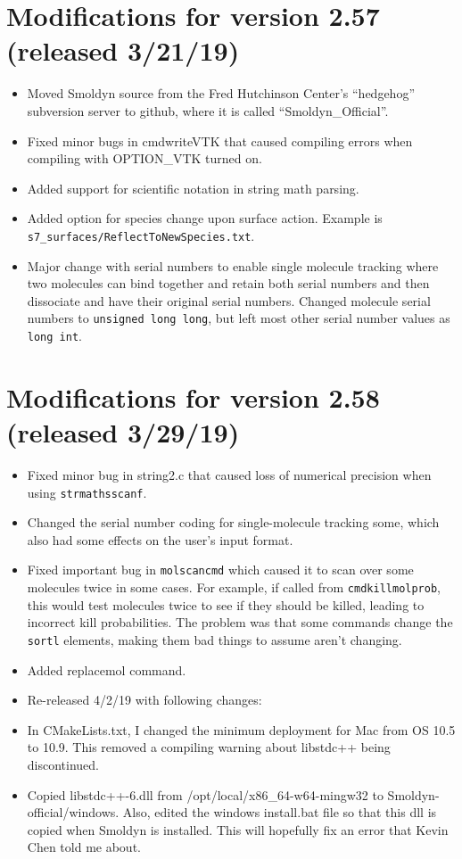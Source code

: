 \documentclass {scrbook}
\newcommand {\ttt} {\texttt}
\begin{document}
\section{Modifications for version 2.57 (released 3/21/19)}
\begin{itemize}
\item Moved Smoldyn source from the Fred Hutchinson Center's ``hedgehog'' subversion server to github, where it is called ``Smoldyn\_Official''.
\item Fixed minor bugs in cmdwriteVTK that caused compiling errors when compiling with OPTION\_VTK turned on.
\item Added support for scientific notation in string math parsing.
\item Added option for species change upon surface action. Example is \ttt{s7\_surfaces/ReflectToNewSpecies.txt}.
\item Major change with serial numbers to enable single molecule tracking where two molecules can bind together and retain both serial numbers and then dissociate and have their original serial numbers. Changed molecule serial numbers to \ttt{unsigned long long}, but left most other serial number values as \ttt{long int}.
\end{itemize}

\section{Modifications for version 2.58 (released 3/29/19)}
\begin{itemize}
\item Fixed minor bug in string2.c that caused loss of numerical precision when using \ttt{strmathsscanf}.
\item Changed the serial number coding for single-molecule tracking some, which also had some effects on the user's input format.
\item Fixed important bug in \ttt{molscancmd} which caused it to scan over some molecules twice in some cases. For example, if called from \ttt{cmdkillmolprob}, this would test molecules twice to see if they should be killed, leading to incorrect kill probabilities. The problem was that some commands change the \ttt{sortl} elements, making them bad things to assume aren't changing.
\item Added replacemol command.
\item Re-released 4/2/19 with following changes:
\item In CMakeLists.txt, I changed the minimum deployment for Mac from OS 10.5 to 10.9. This removed a compiling warning about libstdc++ being discontinued.
\item Copied libstdc++-6.dll from /opt/local/x86\_64-w64-mingw32 to Smoldyn-official/windows. Also, edited the windows install.bat file so that this dll is copied when Smoldyn is installed. This will hopefully fix an error that Kevin Chen told me about.
\end{itemize}
\end{document}
